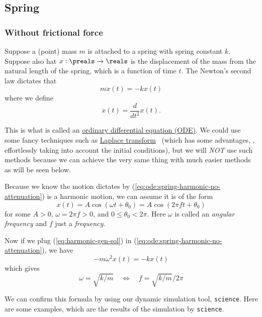 \documentclass{article}
\begin{document}
\subsection{Spring}

\subsubsection{Without frictional force}

Suppose a (point) mass $m$ is attached to a spring with spring constant $k$.
Suppose also hat $x:\preals\to\reals$ is the displacement of the mass from the natural length of the spring,
which is a function of time $t$.
The Newton's second law dictates that
\begin{equation}
\label{eq:ode:spring-harmonic-no-attenuation}
	m \ddot{x}(t)
	=
	-kx(t)
\end{equation}
where we define
\[
	\ddot{x}(t) = \frac{d}{dt^2} x(t).
\]

This is what is called an \href{https://en.wikipedia.org/wiki/Ordinary_differential_equation}{ordinary differential equation (ODE)}.
We could use some fancy techniques such as \href{https://en.wikipedia.org/wiki/Laplace_transform}{Laplace transform}~\cite{Laplace-transform}
(which has some advantages, \eg, effortlessly taking into account the initial conditions),
but we will \emph{NOT} use such methods
because we can achieve the very same thing with much easier methods as will be seen below.

Because we know the motion dictates by (\ref{eq:ode:spring-harmonic-no-attenuation}) is a harmonic motion,
we can assume it is of the form
\begin{equation}
\label{eq:harmonic-gen-sol}
	x(t) = A \cos(\omega t + \theta_0)
	= A \cos(2\pi f t + \theta_0)
\end{equation}
for some $A>0$, $\omega=2\pi f >0$, and $0\leq \theta_0 <2\pi$.
Here $\omega$ is called an \emph{angular frequency}
and $f$ just a \emph{frequency}.

Now if we plug (\ref{eq:harmonic-gen-sol}) in (\ref{eq:ode:spring-harmonic-no-attenuation}),
we have
\[
-m \omega^2 x(t) = - k x(t)
\]
which gives
\begin{equation}
\label{eq:freq-sol}
\omega = \sqrt{k/m}
\quad
\Leftrightarrow
\quad
f = \sqrt{k/m} / 2\pi
\end{equation}

We can confirm this formula by using our dynamic simulation tool, {\tt science}.
Here are some examples, which are the results of the simulation by {\tt science}.
\end{document}
